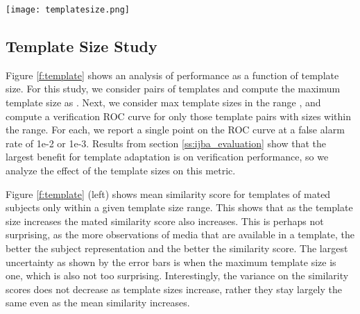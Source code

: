 \documentclass[10pt,twocolumn,letterpaper]{article}
\theoremstyle{definition}		\newtheorem{defn}[thm]{Definition}
\newcommand{\figwidth}{6.85in}
\begin{document}
\ifdefined\ECCV
\begin{figure*}[t]
\begin{centering}
\texttt{[image: templatesize.png]} 
\caption{Template size analysis. (left) Similarity score increases as a function of maximum number of media, where the standard deviation is largest when template size is one. (right) True match rate as a function of maximum number of unique images or videos in a template pair, which shows that verification performance levels off at a maximum of {\em three} unique media per template.}
\label{f:template}
\end{centering}
\end{figure*}

 \fi











\subsection{Template Size Study}
\label{ss:templatesize}





Figure \ref{f:template} shows an analysis of performance as a function of template size.  For this study, we consider pairs of templates  and compute the maximum template size as .   Next, we consider max template sizes in the range , and compute a verification ROC curve for only those template pairs with sizes within the range. For each, we report a single point on the ROC curve at a false alarm rate of 1e-2 or 1e-3.  Results from section \ref{ss:ijba_evaluation} show that the largest benefit for template adaptation is on verification performance, so we analyze the effect of the template sizes on this metric.   

Figure \ref{f:template} (left) shows mean similarity score for templates of mated subjects only within a given template size range.  This shows that as the template size increases the mated similarity score also increases.  This is perhaps not surprising, as the more observations of media that are available in a template, the better the subject representation and the better the similarity score.  The largest uncertainty as shown by the error bars is when the maximum template size is one, which is also not too surprising.  Interestingly, the variance on the similarity scores does not decrease as template sizes increase, rather they stay largely the same even as the mean similarity increases.
\end{document}
